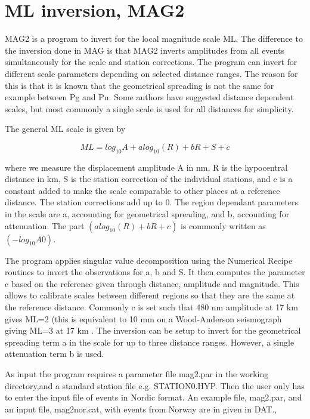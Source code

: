\section{ML inversion, MAG2}
\label{MAG2}

MAG2 is a program to invert for the local magnitude scale ML. 
The difference to the inversion done in MAG is that MAG2 inverts 
amplitudes from all events simultaneously for the scale and 
station corrections. The program can invert for different scale 
parameters depending on selected distance ranges. The reason for 
this is that it is known that the geometrical spreading is not 
the same for example between Pg and Pn. Some authors have suggested 
distance dependent scales, but most commonly a single scale is used 
for all distances for simplicity.

The general ML scale is given by 

\begin{displaymath}
ML = log_{10} A + a log_{10}(R) + b R + S + c
\end{displaymath}

where we measure the displacement amplitude A in nm, R is the hypocentral 
distance in km, S is the station correction of the individual stations, 
and c is a constant added to make the scale comparable to other places at a 
reference distance. The station corrections add up to 0. The region 
dependant parameters in the scale are a, accounting for geometrical 
spreading, and b, accounting for attenuation. The part 
$(a log_{10}(R) + b R + c)$ is commonly written as $(-log_{10} A0)$. 

The program applies singular value decomposition using 
the Numerical Recipe \citep{press2003} routines to invert 
the observations for a, b and S. It then computes the parameter 
c based on the reference given through distance, amplitude and 
magnitude. This allows to calibrate scales between different 
regions so that they are the same at the reference distance. 
Commonly c is set such that 480 nm amplitude at 17 km gives ML=2 
(this is equivalent to 10 mm on a Wood-Anderson seismograph 
giving ML=3 at 17 km \citep{hutton1987}. The inversion 
can be setup to invert for the geometrical spreading  term a 
in the scale for up to three distance ranges. However, a single 
attenuation term b is used.

As input the program requires a parameter file mag2.par in the 
working directory,and a standard station file e.g. STATION0.HYP. 
Then the user only has to enter the input file of events in Nordic 
format. An example file, mag2.par, and an input file, mag2nor.cat, 
with events from Norway are in given in DAT., 

